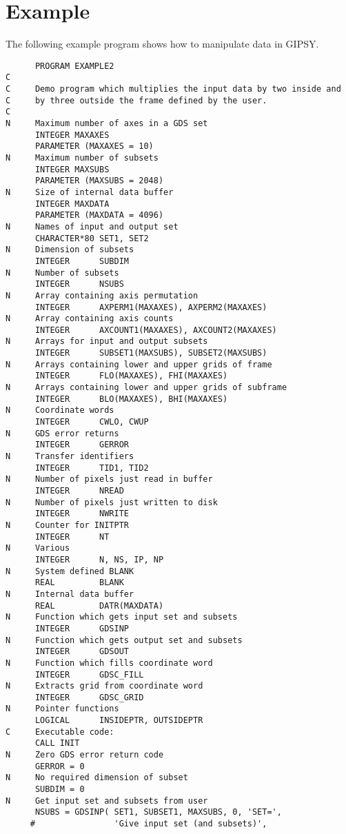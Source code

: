 \section{Example}

The following example program shows how to manipulate data in GIPSY.

\begin{verbatim}
      PROGRAM EXAMPLE2
C
C     Demo program which multiplies the input data by two inside and
C     by three outside the frame defined by the user.
C
N     Maximum number of axes in a GDS set
      INTEGER MAXAXES
      PARAMETER (MAXAXES = 10)
N     Maximum number of subsets
      INTEGER MAXSUBS
      PARAMETER (MAXSUBS = 2048)
N     Size of internal data buffer
      INTEGER MAXDATA
      PARAMETER (MAXDATA = 4096)
N     Names of input and output set
      CHARACTER*80 SET1, SET2
N     Dimension of subsets
      INTEGER      SUBDIM
N     Number of subsets
      INTEGER      NSUBS
N     Array containing axis permutation
      INTEGER      AXPERM1(MAXAXES), AXPERM2(MAXAXES)
N     Array containing axis counts
      INTEGER      AXCOUNT1(MAXAXES), AXCOUNT2(MAXAXES)
N     Arrays for input and output subsets
      INTEGER      SUBSET1(MAXSUBS), SUBSET2(MAXSUBS)
N     Arrays containing lower and upper grids of frame
      INTEGER      FLO(MAXAXES), FHI(MAXAXES)
N     Arrays containing lower and upper grids of subframe
      INTEGER      BLO(MAXAXES), BHI(MAXAXES)
N     Coordinate words
      INTEGER      CWLO, CWUP
N     GDS error returns
      INTEGER      GERROR
N     Transfer identifiers
      INTEGER      TID1, TID2
N     Number of pixels just read in buffer
      INTEGER      NREAD
N     Number of pixels just written to disk
      INTEGER      NWRITE
N     Counter for INITPTR
      INTEGER      NT
N     Various
      INTEGER      N, NS, IP, NP
N     System defined BLANK
      REAL         BLANK
N     Internal data buffer
      REAL         DATR(MAXDATA)
N     Function which gets input set and subsets
      INTEGER      GDSINP
N     Function which gets output set and subsets
      INTEGER      GDSOUT
N     Function which fills coordinate word
      INTEGER      GDSC_FILL
N     Extracts grid from coordinate word
      INTEGER      GDSC_GRID
N     Pointer functions
      LOGICAL      INSIDEPTR, OUTSIDEPTR
C     Executable code:
      CALL INIT
N     Zero GDS error return code
      GERROR = 0
N     No required dimension of subset
      SUBDIM = 0
N     Get input set and subsets from user
      NSUBS = GDSINP( SET1, SUBSET1, MAXSUBS, 0, 'SET=',
     #                'Give input set (and subsets)',

\end{verbatim}
